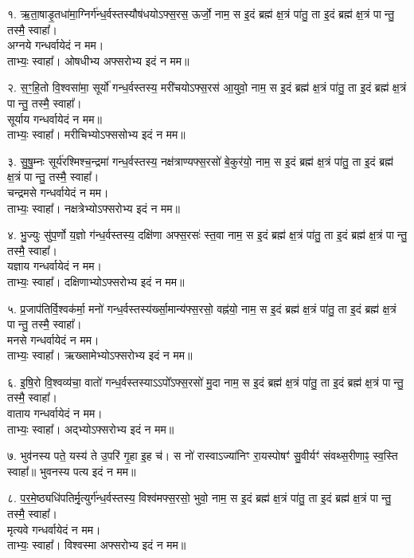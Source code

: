 १. ऋ॒ता॒षाडृ॒तधा॑मा॒ग्निर्ग॑न्ध॒र्वस्तस्यौष॑धयोऽफ्स॒रस॒ ऊर्जो॒ नाम॒
स इ॒दं ब्रह्म॑ क्ष॒त्रं पा॑तु॒ ता इ॒दं ब्रह्म॑ क्ष॒त्रं पान्तु॒ तस्मै॒ स्वाहा᳚। \\
अग्नये गन्धर्वायेदं न मम।\\
ताभ्यः॒ स्वाहा᳚। ओषधीभ्य अफ्सरोभ्य इदं न मम॥

२. स॒ꣳ॒हि॒तो वि॒श्वसा॑मा॒ सूर्यो॑ गन्ध॒र्वस्तस्य॒ मरी॑चयोऽफ्स॒रस॑ आ॒युवो॒ नाम॒ स इ॒दं ब्रह्म॑ क्ष॒त्रं पा॑तु॒ ता इ॒दं ब्रह्म॑ क्ष॒त्रं पान्तु॒ तस्मै॒ स्वाहा᳚।\\
सूर्याय गन्धर्वायेदं न मम॥\\
ताभ्यः॒ स्वाहा᳚। मरीचिभ्योऽफ्ससोभ्य इदं न मम॥

३. सु॒षु॒म्नः सूर्य॑रश्मिश्च॒न्द्रमा॑ गन्ध॒र्वस्तस्य॒ नक्ष॑त्राण्यफ्स॒रसो॑ बे॒कुर॑यो॒ नाम॒ स इ॒दं ब्रह्म॑ क्ष॒त्रं पा॑तु॒ ता इ॒दं ब्रह्म॑ क्ष॒त्रं पान्तु॒ तस्मै॒ स्वाहा᳚।\\
चन्द्रमसे गन्धर्वायेदं न मम।\\
ताभ्यः॒ स्वाहा᳚। नक्षत्रेभ्योऽफ्सरोभ्य इदं न मम॥

४. भु॒ज्युः सु॑प॒र्णो य॒ज्ञो ग॑न्ध॒र्वस्तस्य॒ दक्षि॑णा अफ्स॒रसः॑ स्त॒वा नाम॒ स इ॒दं ब्रह्म॑ क्ष॒त्रं पा॑तु॒ ता इ॒दं ब्रह्म॑ क्ष॒त्रं पान्तु॒ तस्मै॒ स्वाहा᳚।\\
यज्ञाय गन्धर्वायेदं न मम।\\
ताभ्यः॒ स्वाहा᳚। दक्षिणाभ्योऽफ्सरोभ्य इदं न मम॥

५. प्र॒जाप॑तिर्वि॒श्वक॑र्मा॒ मनो॑ गन्ध॒र्वस्तस्य॑र्ख्सा॒मान्य॑फ्स॒रसो॒ वह्न॑यो॒ नाम॒ स इ॒दं ब्रह्म॑ क्ष॒त्रं पा॑तु॒ ता इ॒दं ब्रह्म॑ क्ष॒त्रं पान्तु॒ तस्मै॒ स्वाहा᳚।\\
मनसे गन्धर्वायेदं न मम।\\
ताभ्यः॒ स्वाहा᳚। ऋख्सामेभ्योऽफ्सरोभ्य इदं न मम॥

६. इ॒षि॒रो वि॒श्वव्य॑चा॒ वातो॑ गन्ध॒र्वस्तस्याऽऽपो᳚ऽफ्स॒रसो॑ मु॒दा नाम॒ स इ॒दं ब्रह्म॑ क्ष॒त्रं पा॑तु॒ ता इ॒दं ब्रह्म॑ क्ष॒त्रं पान्तु॒ तस्मै॒ स्वाहा᳚।\\
वाताय गन्धर्वायेदं न मम।\\
ताभ्यः॒ स्वाहा᳚। अद्भ्योऽफ्सरोभ्य इदं न मम॥

७. भुव॑नस्य पते॒ यस्य॑ ते उ॒परि॑ गृ॒हा इ॒ह च॑।
स नो॑ रास्वाऽज्या॑निꣳ रा॒यस्पोषꣳ॑ सु॒वीर्यꣳ॑ संवथ्स॒रीणाꣴ॒ स्व॒स्ति स्वाहा᳚॥ भुवनस्य पत्य इदं न मम॥

८. प॒र॒मे॒ष्ठ्यधि॑पतिर्मृ॒त्युर्ग॑न्ध॒र्वस्तस्य॒ विश्व॑मफ्स॒रसो॒ भुवो॒ नाम॒ स इ॒दं ब्रह्म॑ क्ष॒त्रं पा॑तु॒ ता इ॒दं ब्रह्म॑ क्ष॒त्रं पान्तु॒ तस्मै॒ स्वाहा᳚।\\
मृत्यवे गन्धर्वायेदं न मम।\\
ताभ्यः॒ स्वाहा᳚। विश्वस्मा अफ्सरोभ्य इदं न मम॥

